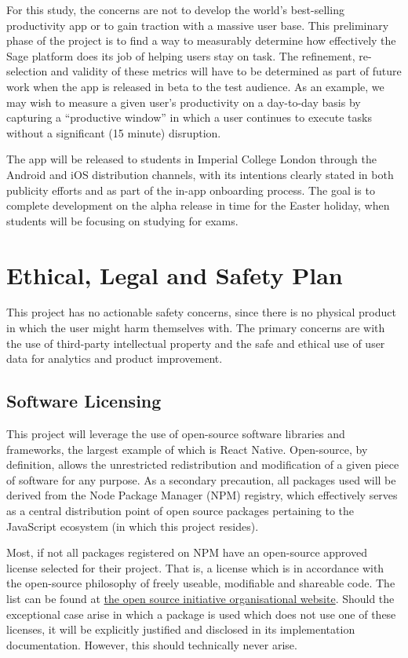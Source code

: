 For this study, the concerns are not to develop the world's best-selling productivity app or to gain traction with a massive user base. This preliminary phase of the project is to find a way to measurably determine how effectively the Sage platform does its job of helping users stay on task. The refinement, re-selection and validity of these metrics will have to be determined as part of future work when the app is released in beta to the test audience. As an example, we may wish to measure a given user's productivity on a day-to-day basis by capturing a ``productive window'' in which a user continues to execute tasks without a significant (15 minute) disruption.

The app will be released to students in Imperial College London through the Android and iOS distribution channels, with its intentions clearly stated in both publicity efforts and as part of the in-app onboarding process. The goal is to complete development on the alpha release in time for the Easter holiday, when students will be focusing on studying for exams.

\section{Ethical, Legal and Safety Plan}
This project has no actionable safety concerns, since there is no physical product in which the user might harm themselves with. The primary concerns are with the use of third-party intellectual property and the safe and ethical use of user data for analytics and product improvement.

\subsection{Software Licensing}
This project will leverage the use of open-source software libraries and frameworks, the largest example of which is React Native. Open-source, by definition, allows the unrestricted redistribution and modification of a given piece of software for any purpose. As a secondary precaution, all packages used will be derived from the Node Package Manager (NPM) registry, which effectively serves as a central distribution point of open source packages pertaining to the JavaScript ecosystem (in which this project resides).

Most, if not all packages registered on NPM have an open-source approved license selected for their project. That is, a license which is in accordance with the open-source philosophy of freely useable, modifiable and shareable code. The list can be found at \href{https://opensource.org/licenses}{the open source initiative organisational website}. Should the exceptional case arise in which a package is used which does not use one of these licenses, it will be explicitly justified and disclosed in its implementation documentation. However, this should technically never arise.

